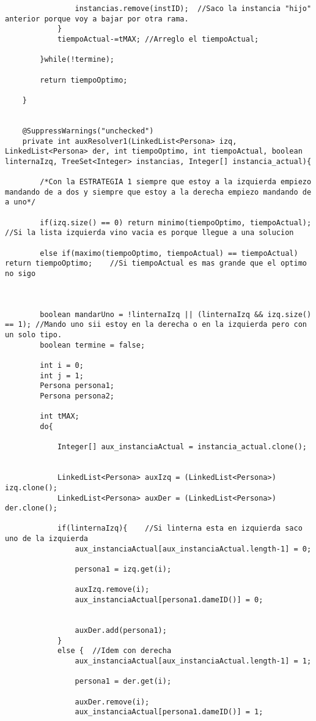 \begin{lstlisting}
				instancias.remove(instID);	//Saco la instancia "hijo" anterior porque voy a bajar por otra rama.
			}
			tiempoActual-=tMAX;	//Arreglo el tiempoActual;

		}while(!termine);
		
		return tiempoOptimo;

	}


	@SuppressWarnings("unchecked")
	private int auxResolver1(LinkedList<Persona> izq, LinkedList<Persona> der, int tiempoOptimo, int tiempoActual, boolean linternaIzq, TreeSet<Integer> instancias, Integer[] instancia_actual){
		
		/*Con la ESTRATEGIA 1 siempre que estoy a la izquierda empiezo mandando de a dos y siempre que estoy a la derecha empiezo mandando de a uno*/
		
		if(izq.size() == 0) return minimo(tiempoOptimo, tiempoActual);	//Si la lista izquierda vino vacia es porque llegue a una solucion 

		else if(maximo(tiempoOptimo, tiempoActual) == tiempoActual) return tiempoOptimo;	//Si tiempoActual es mas grande que el optimo no sigo
		
		
		
		boolean mandarUno = !linternaIzq || (linternaIzq && izq.size() == 1); //Mando uno sii estoy en la derecha o en la izquierda pero con un solo tipo.
		boolean termine = false;

		int i = 0;
		int j = 1;
		Persona persona1;
		Persona persona2;

		int tMAX;
		do{
			
			Integer[] aux_instanciaActual = instancia_actual.clone();					
			
			
			LinkedList<Persona> auxIzq = (LinkedList<Persona>) izq.clone();
			LinkedList<Persona> auxDer = (LinkedList<Persona>) der.clone();

			if(linternaIzq){	//Si linterna esta en izquierda saco uno de la izquierda
				aux_instanciaActual[aux_instanciaActual.length-1] = 0;
				
				persona1 = izq.get(i);

				auxIzq.remove(i);
				aux_instanciaActual[persona1.dameID()] = 0;
				
				
				auxDer.add(persona1);
			}
			else { 	//Idem con derecha
				aux_instanciaActual[aux_instanciaActual.length-1] = 1;

				persona1 = der.get(i);

				auxDer.remove(i);
				aux_instanciaActual[persona1.dameID()] = 1;
				

\end{lstlisting}

